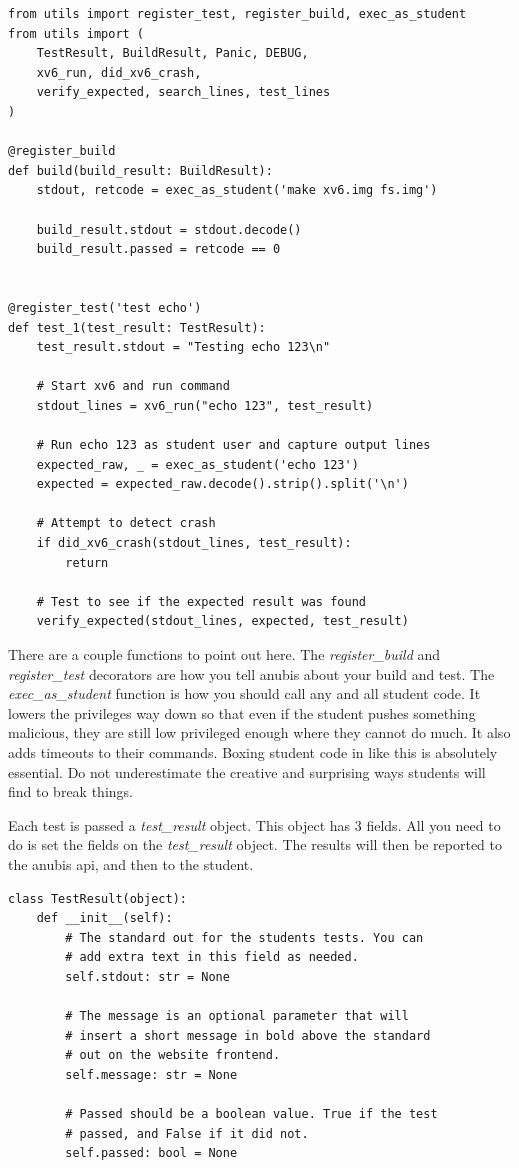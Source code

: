 \begin{verbatim}
from utils import register_test, register_build, exec_as_student
from utils import (
    TestResult, BuildResult, Panic, DEBUG,
    xv6_run, did_xv6_crash,
    verify_expected, search_lines, test_lines
)

@register_build
def build(build_result: BuildResult):
    stdout, retcode = exec_as_student('make xv6.img fs.img')

    build_result.stdout = stdout.decode()
    build_result.passed = retcode == 0


@register_test('test echo')
def test_1(test_result: TestResult):
    test_result.stdout = "Testing echo 123\n"

    # Start xv6 and run command
    stdout_lines = xv6_run("echo 123", test_result)

    # Run echo 123 as student user and capture output lines
    expected_raw, _ = exec_as_student('echo 123')
    expected = expected_raw.decode().strip().split('\n')

    # Attempt to detect crash
    if did_xv6_crash(stdout_lines, test_result):
        return

    # Test to see if the expected result was found
    verify_expected(stdout_lines, expected, test_result)
\end{verbatim}

There are a couple functions to point out here.
The \textit{register\_build} and \textit{register\_test} decorators are how
you tell anubis about your build and test.
The \textit{exec\_as\_student} function is how you should call any and all student code.
It lowers the privileges way down so that even if the student pushes something
malicious, they are still low privileged enough where they cannot do much.
It also adds timeouts to their commands.
Boxing student code in like this is absolutely essential.
Do not underestimate the creative and surprising ways students will find to break things.

Each test is passed a \textit{test\_result} object.
This object has 3 fields.
All you need to do is set the fields on the \textit{test\_result} object.
The results will then be reported to the anubis api, and then to the student.

\begin{verbatim}
class TestResult(object):
    def __init__(self):
        # The standard out for the students tests. You can
        # add extra text in this field as needed.
        self.stdout: str = None

        # The message is an optional parameter that will
        # insert a short message in bold above the standard
        # out on the website frontend.
        self.message: str = None

        # Passed should be a boolean value. True if the test
        # passed, and False if it did not.
        self.passed: bool = None
\end{verbatim}

